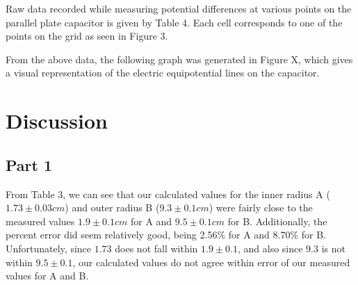 \documentclass[letterpaper]{article}
\begin{document}
Raw data recorded while measuring potential differences at various points on
the parallel plate capacitor is given by Table 4. Each cell corresponds to one
of the points on the grid as seen in Figure 3.


\newpage
From the above data, the following graph was generated in Figure X, which gives a visual representation of the electric
equipotential lines on the capacitor.




\section{Discussion}

\subsection{Part 1}
From Table 3, we can see that our calculated values for the inner radius A
($1.73 \pm 0.03 cm$)
and outer radius B
($9.3 \pm 0.1 cm$) were fairly close to the measured values $1.9 \pm 0.1 cm$ for A
and $ 9.5 \pm 0.1 cm$ for B.
Additionally, the percent error did seem relatively good, being 2.56\% for A and 8.70\% for B.
Unfortunately, since $1.73$ does not fall within $1.9 \pm 0.1$,
and also since $9.3$ is not within $9.5 \pm 0.1$, our calculated values do not
agree within error of our measured values for A and B.
\end{document}
